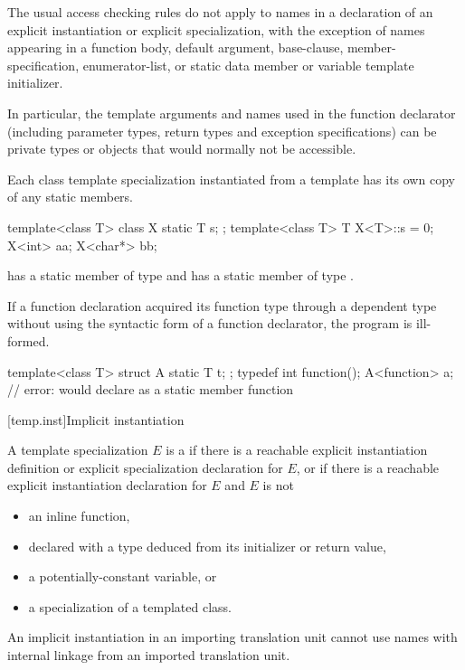 \pnum
The usual access checking rules do not apply to names
in a declaration of an explicit instantiation or explicit specialization,
with the exception of names appearing in a function body,
default argument, base-clause, member-specification, enumerator-list,
or static data member or variable template initializer.
\begin{note}
In particular, the template arguments and names
used in the function declarator
(including parameter types, return types and exception specifications)
can be private types or objects that would normally not be accessible.
\end{note}

\pnum
Each class template specialization instantiated from a template has its own
copy of any static members.
\begin{example}
\begin{codeblock}
template<class T> class X {
  static T s;
};
template<class T> T X<T>::s = 0;
X<int> aa;
X<char*> bb;
\end{codeblock}

has a static member
of type
and
has a static member
of type
.
\end{example}

\pnum
If a function declaration acquired its function type through
a dependent type without using the syntactic form of
a function declarator, the program is ill-formed.
\begin{example}
\begin{codeblock}
template<class T> struct A {
  static T t;
};
typedef int function();
A<function> a;      // error: would declare  as a static member function
\end{codeblock}
\end{example}

[temp.inst]{Implicit instantiation}

\pnum
A template specialization $E$ is a 
if there is a reachable
explicit instantiation definition or
explicit specialization declaration
for $E$, or
if there is a reachable explicit instantiation declaration for $E$ and
$E$ is not
\begin{itemize}
\item
an inline function,
\item
declared with a type deduced
from its initializer or return value,
\item
a potentially-constant variable, or
\item
a specialization of a templated class.
\end{itemize}
\begin{note}
An implicit instantiation in an importing translation unit
cannot use names with internal linkage
from an imported translation unit.
\end{note}

